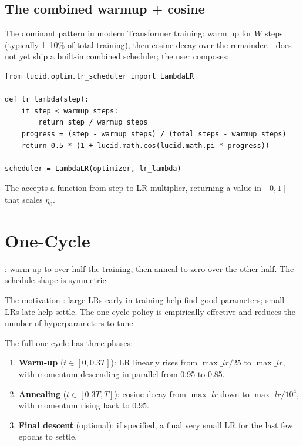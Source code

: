 \subsection{The combined warmup + cosine}
\label{ssec:lr_schedulers:warmup_cosine}

The dominant pattern in modern Transformer training: warm up for
$W$ steps (typically 1--10\% of total training), then cosine
decay over the remainder. \Lucid\ does not yet ship a built-in
combined scheduler; the user composes:

\begin{lstlisting}[style=lucid,language=LucidPython]
from lucid.optim.lr_scheduler import LambdaLR

def lr_lambda(step):
    if step < warmup_steps:
        return step / warmup_steps
    progress = (step - warmup_steps) / (total_steps - warmup_steps)
    return 0.5 * (1 + lucid.math.cos(lucid.math.pi * progress))

scheduler = LambdaLR(optimizer, lr_lambda)
\end{lstlisting}

The  accepts a function from step to LR multiplier,
returning a value in $[0, 1]$ that scales $\eta_0$.

\section{One-Cycle}
\label{sec:lr_schedulers:one_cycle}

: warm up to
 over half the training, then anneal to zero over
the other half. The schedule shape is symmetric.

The motivation \cite{smith_one_cycle_2018}: large LRs early in
training help find good parameters; small LRs late help settle.
The one-cycle policy is empirically effective and reduces the
number of hyperparameters to tune.

The full one-cycle has three phases:

\begin{enumerate}
  \item \textbf{Warm-up} ($t \in [0, 0.3 T]$): LR linearly
    rises from $\max\_lr / 25$ to $\max\_lr$, with momentum
    descending in parallel from 0.95 to 0.85.
  \item \textbf{Annealing} ($t \in [0.3 T, T]$): cosine decay
    from $\max\_lr$ down to $\max\_lr / 10^4$, with momentum
    rising back to 0.95.
  \item \textbf{Final descent} (optional): if specified, a
    final very small LR for the last few epochs to settle.
\end{enumerate}

